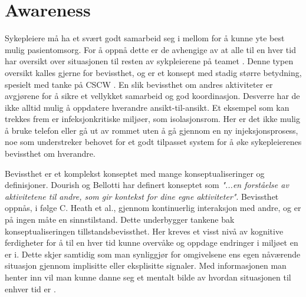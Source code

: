 \section{Awareness}
\label{chp: awareness}

Sykepleiere må ha et svært godt samarbeid seg i mellom for å kunne yte best mulig pasientomsorg. For å oppnå dette er de avhengige av at alle til en hver tid har oversikt over situasjonen til resten av sykpleierene på teamet \cite{Evjemo}. Denne typen oversikt kalles gjerne for bevissthet, og er et konsept med stadig større betydning, spesielt med tanke på CSCW \cite{Dourish92}. En slik bevissthet om andres aktiviteter er avgjørene for å sikre et vellykket samarbeid og god koordinasjon\cite{KlemetsRedundancy}. Desverre har de ikke alltid mulig å oppdatere hverandre ansikt-til-ansikt. Et eksempel som kan trekkes frem er infeksjonkritiske miljøer, som isolasjonsrom. Her er det ikke mulig å bruke telefon eller gå ut av rommet uten å gå gjennom en ny injeksjonsprosess, noe som understreker behovet for et godt tilpasset system for å  øke sykepleierenes bevissthet om hverandre.

\noindent
Bevissthet er et komplekst konseptet \cite{KlemetsRedundancy}\cite{Gutwin04} med mange konseptualiseringer og definisjoner. Dourish og Bellotti har definert konseptet som \emph{"...en forståelse av aktivitetene til andre, som gir kontekst for dine egne aktiviteter"}. Bevissthet oppnås, i følge C. Heath et al., gjennom kontinuerlig interaksjon med andre, og er på ingen måte en sinnstilstand. Dette underbygger tankene bak konseptualiseringen tillstandsbevissthet. Her kreves et visst nivå av kognitive ferdigheter for å til en hver tid kunne overvåke og oppdage endringer i miljøet en er i. Dette skjer samtidig som man synliggjør for omgivelsene ens egen nåværende situasjon gjennom implisitte eller eksplisitte signaler. Med informasjonen man henter inn vil man kunne danne seg et mentalt bilde av hvordan situasjonen til enhver tid er \cite{Evjemo}. 
